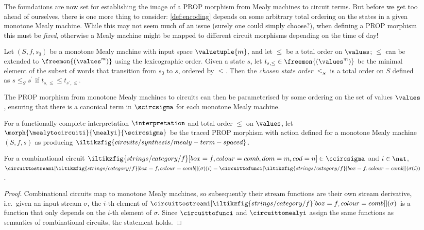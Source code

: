 The foundations are now set for establishing the image of a PROP morphism from
Mealy machines to circuit terms.
But before we get too ahead of ourselves, there is one more thing to consider:
\cref{def:encoding} depends on some arbitrary total ordering on the states in a
given monotone Mealy machine.
While this may not seem much of an issue (surely one could simply choose?), when
defining a PROP morphism this must be \emph{fixed}, otherwise a Mealy machine
might be mapped to different circuit morphisms depending on the time of day!

\begin{definition}
    Let \((S, f, s_0)\) be a monotone Mealy machine with input space
    \(\valuetuple{m}\), and let \(\leq\) be a total order on \(\values\);
    \(\leq\) can be extended to \(\freemon{(\values^m)}\) using the
    lexicographic order.
    Given a state \(s\), let \(t_{s,\leq} \in \freemon{(\values^m)}\) be
    the minimal element of the subset of words that transition from \(s_0\) to
    \(s\), ordered by \(\leq\).
    Then the \emph{chosen state order} \(\leq_S\) is a total order on \(S\)
    defined as \(s \leq_S s^\prime\) if \(t_{s,\leq} \leq t_{s^\prime,\leq}\).
\end{definition}

The PROP morphism from monotone Mealy machines to circuits can then be
parameterised by some ordering on the set of values \(\values\), ensuring that
there is a canonical term in \(\scircsigma\) for each monotone Mealy machine.

\begin{definition}\label{def:mealy-to-circuit}
    For a functionally complete interpretation \(\interpretation\) and total
    order \(\leq\) on \(\values\), let \(
    \morph{
        \mealytocircuiti
    }{
        \mealyi
    }{
        \scircsigma
    }
    \) be the traced PROP morphism with action defined for a monotone Mealy
    machine \((S,f,s)\) as producing \(
    \iltikzfig{circuits/synthesis/mealy-term-spaced}
    \).
\end{definition}

\begin{lemma}\label{lem:combinational-streams}
    For a combinational circuit \(
    \iltikzfig{strings/category/f}[box=f,colour=comb,dom=m,cod=n]
    \in \ccircsigma
    \) and \(i \in \nat\), \(
    \circuittostreami[
        \iltikzfig{strings/category/f}[box=f,colour=comb]
    ](\sigma)(i)
    =
    \circuittofunci[
        \iltikzfig{strings/category/f}[box=f,colour=comb]
    ](\sigma(i))
    \).
\end{lemma}
\begin{proof}
    Combinational circuits map to monotone Mealy machines, so subsequently
    their stream functions are their own stream derivative, i.e.\ given an
    input stream \(\sigma\), the \(i\)-th element of \(
    \circuittostreami[
        \iltikzfig{strings/category/f}[box=f,colour=comb]
    ](\sigma)
    \) is a function that only depends on the \(i\)-th element of \(\sigma\).
    Since \(\circuittofunci\) and \(\circuittomealyi\) assign the same functions
    as semantics of combinational circuits, the statement holds.
\end{proof}

